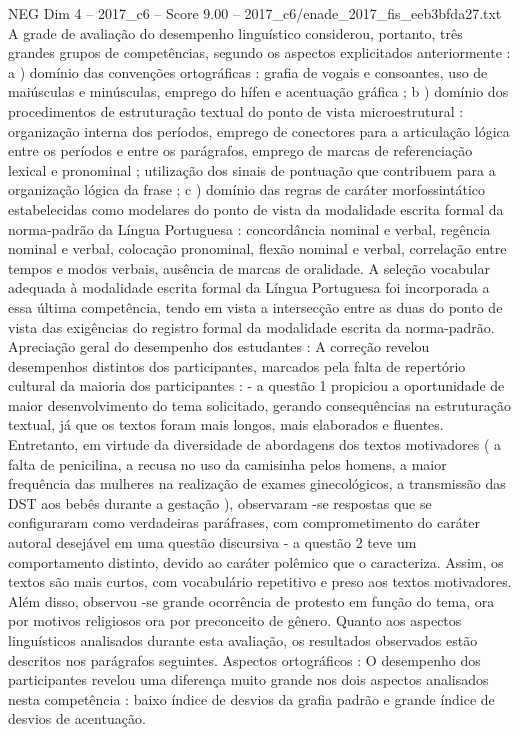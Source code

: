\begin{textsample}{NEG Dim 4 – 2017\_c6 – Score 9.00 – 2017\_c6/enade\_2017\_fis\_eeb3bfda27.txt}
A grade de avaliação do desempenho linguístico considerou, portanto, três grandes grupos de competências, segundo os aspectos explicitados anteriormente : a ) domínio das convenções ortográficas : grafia de vogais e consoantes, uso de maiúsculas e minúsculas, emprego do hífen e acentuação gráfica ; b ) domínio dos procedimentos de estruturação textual do ponto de vista microestrutural : organização interna dos períodos, emprego de conectores para a articulação lógica entre os períodos e entre os parágrafos, emprego de marcas de referenciação lexical e pronominal ; utilização dos sinais de pontuação que contribuem para a organização lógica da frase ; c ) domínio das regras de caráter morfossintático estabelecidas como modelares do ponto de vista da modalidade escrita formal da norma-padrão da Língua Portuguesa : concordância nominal e verbal, regência nominal e verbal, colocação pronominal, flexão nominal e verbal, correlação entre tempos e modos verbais, ausência de marcas de oralidade.
A seleção vocabular adequada à modalidade escrita formal da Língua Portuguesa foi incorporada a essa última competência, tendo em vista a intersecção entre as duas do ponto de vista das exigências do registro formal da modalidade escrita da norma-padrão.
Apreciação geral do desempenho dos estudantes : A correção revelou desempenhos distintos dos participantes, marcados pela falta de repertório cultural da maioria dos participantes : - a questão 1 propiciou a oportunidade de maior desenvolvimento do tema solicitado, gerando consequências na estruturação textual, já que os textos foram mais longos, mais elaborados e fluentes.
Entretanto, em virtude da diversidade de abordagens dos textos motivadores ( a falta de penicilina, a recusa no uso da camisinha pelos homens, a maior frequência das mulheres na realização de exames ginecológicos, a transmissão das DST aos bebês durante a gestação ), observaram -se respostas que se configuraram como verdadeiras paráfrases, com comprometimento do caráter autoral desejável em uma questão discursiva - a questão 2 teve um comportamento distinto, devido ao caráter polêmico que o caracteriza.
Assim, os textos são mais curtos, com vocabulário repetitivo e preso aos textos motivadores.
Além disso, observou -se grande ocorrência de protesto em função do tema, ora por motivos religiosos ora por preconceito de gênero.
Quanto aos aspectos linguísticos analisados durante esta avaliação, os resultados observados estão descritos nos parágrafos seguintes.
Aspectos ortográficos : O desempenho dos participantes revelou uma diferença muito grande nos dois aspectos analisados nesta competência : baixo índice de desvios da grafia padrão e grande índice de desvios de acentuação.

\end{textsample}
